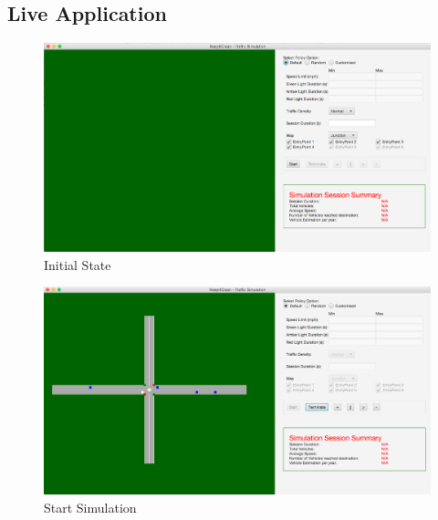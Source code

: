 \documentclass[11pt]{article}
\begin{document}
\begin{enumerate}
\subsection{Live Application}
\begin{figure}[H]
        \includegraphics[width=12cm]{Test1}
        \centering
        \caption{Initial State}
        \label{fig:test1}
\end{figure}
\begin{figure}[H]
        \includegraphics[width=12cm]{Test2}
        \centering
        \caption{Start Simulation}
        \label{fig:test2}
\end{figure}


\end{enumerate}
\end{document}
